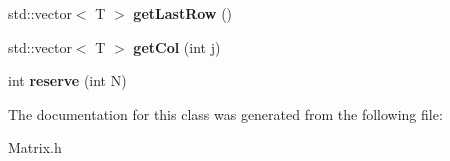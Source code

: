\begin{DoxyCompactItemize}
\item 
\hypertarget{classkeycpp_1_1matrix_a940e406656b5c3ad3e8f1296e2d47fc5}{std\-::vector$<$ T $>$ {\bfseries get\-Last\-Row} ()}\label{classkeycpp_1_1matrix_a940e406656b5c3ad3e8f1296e2d47fc5}

\item 
\hypertarget{classkeycpp_1_1matrix_a9ba947125ca3c1fd98b1cf8e50e289ca}{std\-::vector$<$ T $>$ {\bfseries get\-Col} (int j)}\label{classkeycpp_1_1matrix_a9ba947125ca3c1fd98b1cf8e50e289ca}

\item 
\hypertarget{classkeycpp_1_1matrix_aedf9ec6e9bd1d3edc4152b8caf88b33f}{int {\bfseries reserve} (int N)}\label{classkeycpp_1_1matrix_aedf9ec6e9bd1d3edc4152b8caf88b33f}

\end{DoxyCompactItemize}


The documentation for this class was generated from the following file\-:\begin{DoxyCompactItemize}
\item 
Matrix.\-h\end{DoxyCompactItemize}
